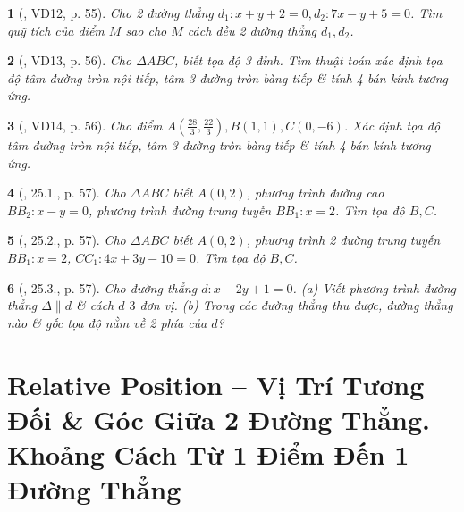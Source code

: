 \documentclass{article}
\newtheorem{baitoan}{}
\begin{document}
\begin{baitoan}[\cite{Hai_Hung_Thu_Tung_ncpt_Toan_10_tap_2}, VD12, p. 55]
	Cho 2 đường thẳng $d_1:x + y + 2 = 0,d_2:7x - y + 5 = 0$. Tìm quỹ tích của điểm $M$ sao cho $M$ cách đều 2 đường thẳng $d_1,d_2$.
\end{baitoan}

\begin{baitoan}[\cite{Hai_Hung_Thu_Tung_ncpt_Toan_10_tap_2}, VD13, p. 56]
	Cho $\Delta ABC$, biết tọa độ 3 đỉnh. Tìm thuật toán xác định tọa độ tâm đường tròn nội tiếp, tâm 3 đường tròn bàng tiếp \& tính 4 bán kính tương ứng.
\end{baitoan}

\begin{baitoan}[\cite{Hai_Hung_Thu_Tung_ncpt_Toan_10_tap_2}, VD14, p. 56]
	Cho điểm $A(\frac{28}{3},\frac{22}{3}),B(1,1),C(0,-6)$. Xác định tọa độ tâm đường tròn nội tiếp, tâm 3 đường tròn bàng tiếp \& tính 4 bán kính tương ứng.
\end{baitoan}

\begin{baitoan}[\cite{Hai_Hung_Thu_Tung_ncpt_Toan_10_tap_2}, 25.1., p. 57]
	Cho $\Delta ABC$ biết $A(0,2)$, phương trình đường cao $BB_2:x - y = 0$, phương trình đường trung tuyến $BB_1:x = 2$. Tìm tọa độ $B,C$.
\end{baitoan}

\begin{baitoan}[\cite{Hai_Hung_Thu_Tung_ncpt_Toan_10_tap_2}, 25.2., p. 57]
	Cho $\Delta ABC$ biết $A(0,2)$, phương trình 2 đường trung tuyến $BB_1:x = 2$, $CC_1:4x + 3y - 10 = 0$. Tìm tọa độ $B,C$.
\end{baitoan}

\begin{baitoan}[\cite{Hai_Hung_Thu_Tung_ncpt_Toan_10_tap_2}, 25.3., p. 57]
	Cho đường thẳng $d:x - 2y + 1 = 0$. (a) Viết phương trình đường thẳng $\Delta\parallel d$ \& cách $d$ $3$ đơn vị. (b) Trong các đường thẳng thu được, đường thẳng nào \& gốc tọa độ nằm về 2 phía của $d$?
\end{baitoan}


\section{Relative Position -- Vị Trí Tương Đối \& Góc Giữa 2 Đường Thẳng. Khoảng Cách Từ 1 Điểm Đến 1 Đường Thẳng}

\end{document}
